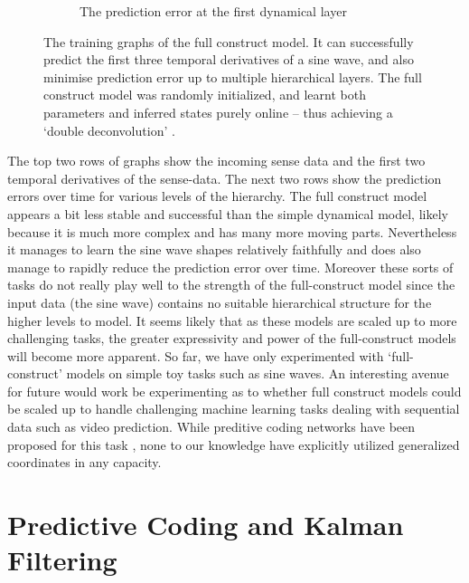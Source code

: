 \begin{figure}[H]
\begin{subfigure}{.3\linewidth}
    \caption{The prediction error at the first dynamical layer}\label{fig:image12}
\end{subfigure}
   \hfill
\caption{The training graphs of the full construct model. It can successfully predict the first three temporal derivatives of a sine wave, and also minimise prediction error up to multiple hierarchical layers. The full construct model was randomly initialized, and learnt both parameters and inferred states purely online -- thus achieving a `double deconvolution' \citep{friston2008DEM}.}
\end{figure}

The top two rows of graphs show the incoming sense data and the first two temporal derivatives of the sense-data. The next two rows show the prediction errors over time for various levels of the hierarchy. The full construct model appears a bit less stable and successful than the simple dynamical model, likely because it is much more complex and has many more moving parts. Nevertheless it manages to learn the sine wave shapes relatively faithfully and does also manage to rapidly reduce the prediction error over time. Moreover these sorts of tasks do not really play well to the strength of the full-construct model since the input data (the sine wave) contains no suitable hierarchical structure for the higher levels to model. It seems likely that as these models are scaled up to more challenging tasks, the greater expressivity and power of the full-construct models will become more apparent. So far, we have only experimented with `full-construct' models on simple toy tasks such as sine waves. An interesting avenue for future would work be experimenting as to whether full construct models could be scaled up to handle challenging machine learning tasks dealing with sequential data such as video prediction. While preditive coding networks have been proposed for this task \citep{lotter2016deep}, none to our knowledge have explicitly utilized generalized coordinates in any capacity.

\section{Predictive Coding and Kalman Filtering}

